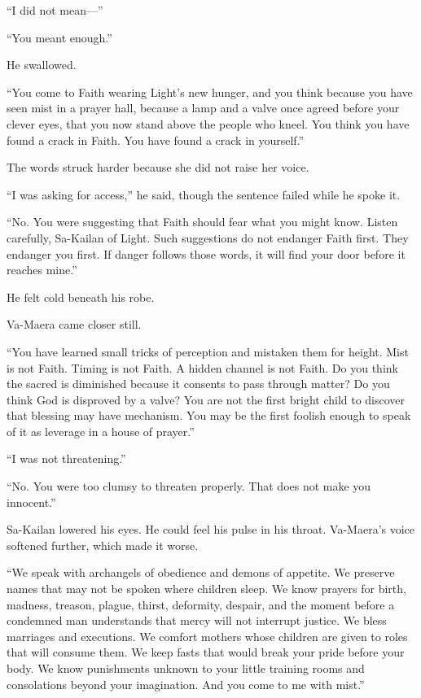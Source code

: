 “I did not mean—”\par

“You meant enough.”\par

He swallowed.\par

“You come to Faith wearing Light’s new hunger, and you think because you have seen mist in a prayer hall, because a lamp and a valve once agreed before your clever eyes, that you now stand above the people who kneel. You think you have found a crack in Faith. You have found a crack in yourself.”\par

The words struck harder because she did not raise her voice.\par

“I was asking for access,” he said, though the sentence failed while he spoke it.\par

“No. You were suggesting that Faith should fear what you might know. Listen carefully, Sa-Kailan of Light. Such suggestions do not endanger Faith first. They endanger you first. If danger follows those words, it will find your door before it reaches mine.”\par

He felt cold beneath his robe.\par

Va-Maera came closer still.\par

“You have learned small tricks of perception and mistaken them for height. Mist is not Faith. Timing is not Faith. A hidden channel is not Faith. Do you think the sacred is diminished because it consents to pass through matter? Do you think God is disproved by a valve? You are not the first bright child to discover that blessing may have mechanism. You may be the first foolish enough to speak of it as leverage in a house of prayer.”\par

“I was not threatening.”\par

“No. You were too clumsy to threaten properly. That does not make you innocent.”\par

Sa-Kailan lowered his eyes. He could feel his pulse in his throat. Va-Maera’s voice softened further, which made it worse.\par

“We speak with archangels of obedience and demons of appetite. We preserve names that may not be spoken where children sleep. We know prayers for birth, madness, treason, plague, thirst, deformity, despair, and the moment before a condemned man understands that mercy will not interrupt justice. We bless marriages and executions. We comfort mothers whose children are given to roles that will consume them. We keep fasts that would break your pride before your body. We know punishments unknown to your little training rooms and consolations beyond your imagination. And you come to me with mist.”\par

